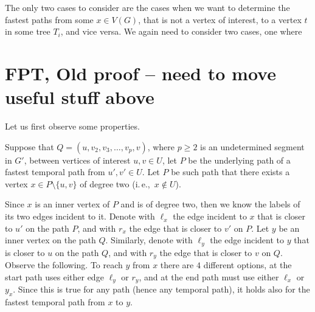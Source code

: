 \documentclass[11pt,a4paper]{article}
\theoremstyle{remark}
\theoremstyle{definition}
\newcommand{\ie}{i.\,e.,\ }
\begin{document}
The only two cases to consider are the cases when we want to determine the fastest paths from some $x \in V(G)$, that is not a vertex of interest, to a vertex $t$ in some tree $T_i$, and vice versa.
We again need to consider two cases, one where 


	


\clearpage

\appendix

\section{FPT, Old proof -- need to move useful stuff above}
Let us first observe some properties.

Suppose that $Q = (u,v_2,v_3, \dots, v_p, v)$, where $p \geq 2$ is an undetermined segment in $G'$, between vertices of interest $u,v \in U$,
let $P$ be the underlying path of a fastest temporal path from $u',v' \in U$.
Let $P$ be such path that there exists a vertex $x \in P \setminus \{u,v\}$ of degree two (\ie $x\notin U$).

Since $x$ is an inner vertex of $P$ and is of degree two, then we know the labels of its two edges incident to it.
Denote with $\ell_x$ the edge incident to $x$ that is closer to $u'$ on the path $P$, and with $r_x$ the edge that is closer to $v'$ on $P$.
Let $y$ be an inner vertex on the path $Q$.
Similarly, denote with $\ell_y$ the edge incident to $y$ that is closer to $u$ on the path $Q$, and with $r_y$ the edge that is closer to $v$ on $Q$.
Observe the following. 
To reach $y$ from $x$ there are $4$ different options, at the start path uses either edge $\ell_y$ or $r_y$, 
and at the end path must use either $\ell_x$ or $y_x$.
Since this is true for any path (hence any temporal path), it holds also for the fastest temporal path from $x$ to $y$.
\end{document}

